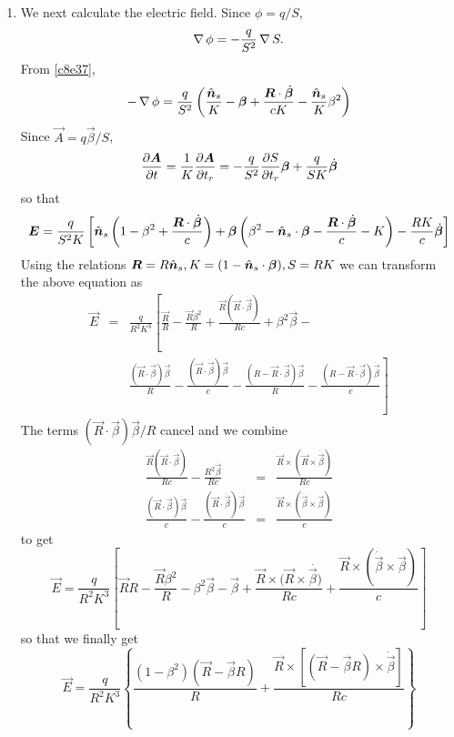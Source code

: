 \begin{enumerate}
\item We next calculate the electric field. Since $\phi = q/S$,
\[
\operatorname{\nabla}\phi = -\frac{q}{S^2}\operatorname{\nabla} S.
\]
From \eqref{c8e37},
\begin{equation}\label{c8e39}
-\operatorname{\nabla}\phi = \frac{q}{S^2}\left(\frac{\hat{\bm{n}}_s}{K} - \bm{\beta} + 
\frac{\bm{R}\cdot\dot{\bm{\beta}}}{cK} - \frac{\hat{\bm{n}}_s}{K}\beta^2\right)
\end{equation}
Since $\vec{A} = q\vec{\beta}/S$,
\[
\frac{\partial{\bm{A}}}{\partial{t}} = \frac{1}{K}\frac{\partial{\bm{A}}}{\partial{t_r}} = 
-\frac{q}{S^2}\frac{\partial{S}}{\partial{t_r}}\bm{\beta} + \frac{q}{SK}\dot{\bm{\beta}}
\]
so that
\begin{equation}\label{c8e40}
\bm{E} = \frac{q}{S^2K}\left[
\hat{\bm{n}}_s\left(1 - \beta^2 + \frac{\bm{R}\cdot\dot{\bm{\beta}}}{c}\right) +
\bm{\beta}\left(\beta^2 - \hat{\bm{n}}_s\cdot\bm{\beta} - 
    \frac{\bm{R}\cdot\dot{\bm{\beta}}}{c} - K\right) - 
\frac{RK}{c}\dot{\bm{\beta}}\right]
\end{equation}
Using the relations $\bm{R} = R\hat{\bm{n}}_s, K = (1 - \hat{\bm{n}}_s\cdot\bm{\beta}), S = RK$
we can transform the above equation as
\begin{eqnarray*}
\vec{E} &=& \frac{q}{R^2K^3}\left[\frac{\vec{R}}{R} - \frac{\vec{R}\beta^2}{R}
 + \frac{\vec{R}(\vec{R}\cdot\dot{\vec{\beta}})}{Rc} + \beta^2\vec{\beta} - \right.\\
 & & \left.\frac{(\vec{R}\cdot\vec{\beta})\vec{\beta}}{R} - 
     \frac{(\vec{R}\cdot\dot{\vec{\beta}})\vec{\beta}}{c} - 
     \frac{(R - \vec{R}\cdot\vec{\beta})\vec{\beta}}{R} - 
     \frac{(R - \vec{R}\cdot\vec{\beta})\dot{\vec{\beta}}}{c}\right]
\end{eqnarray*}
The terms $(\vec{R}\cdot\vec{\beta})\vec{\beta}/R$ cancel and we combine 
\begin{eqnarray*}
\frac{\vec{R}(\vec{R}\cdot\dot{\vec{\beta}})}{Rc} - 
\frac{R^2\dot{\vec{\beta}}}{Rc} &=& 
\frac{\vec{R}\times(\vec{R}\times\dot{\vec{\beta}})}{Rc} \\
\frac{(\vec{R}\cdot\vec{\beta})\dot{\vec{\beta}}}{c} - 
\frac{(\vec{R}\cdot\dot{\vec{\beta}})\vec{\beta}}{c} &=&
\frac{\vec{R}\times(\dot{\vec{\beta}}\times\vec{\beta})}{c}
\end{eqnarray*}
to get
\[
\vec{E} = \frac{q}{R^2K^3}\left[\vec{R}{R} - \frac{\vec{R}\beta^2}{R} -
\beta^2\vec{\beta} - \vec{\beta} + 
\frac{\vec{R}\times(\vec{R}\times\dot{\vec{\beta})}}{Rc} + 
\frac{\vec{R}\times(\dot{\vec{\beta}}\times\vec{\beta})}{c}\right]
\]
so that we finally get
\begin{equation}
\vec{E} = \frac{q}{R^2K^3}\left\{\frac{(1-\beta^2)(\vec{R}-\vec{\beta}R)}{R} +
\frac{\vec{R}\times[(\vec{R} - \vec{\beta}R)\times\dot{\vec{\beta}}]}{Rc}
\right\}
\end{equation}


\end{enumerate}
